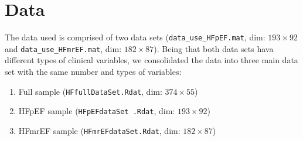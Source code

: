 \documentclass[../thesis.tex]{subfiles}
\begin{document}
\section{Data}
\label{sec:data}

\noindent The data used is comprised of two data sets (\texttt{data\_use\_HFpEF.mat}, dim: $193 \times 92$ and \texttt{data\_use\_HFmrEF.mat}, dim: $182 \times 87$). Being that both data sets hava different types of clinical variables, we consolidated the data into three main data set with the same number and types of variables: 
\begin{enumerate}[label=(\roman*)]
    \item Full sample (\texttt{HFfullDataSet.Rdat}, dim: $374 \times 55$)
    \item HFpEF sample (\texttt{HFpEFdataSet .Rdat}, dim: $193 \times 92$)
    \item HFmrEF sample (\texttt{HFmrEFdataSet.Rdat}, dim: $182 \times 87$)
\end{enumerate}
\end{document}
